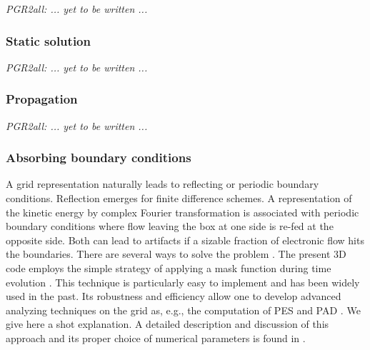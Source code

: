 \documentclass[final,1p]{elsarticle}
\newcommand{\PGRcomm}[1]{{\color{blue}\small\em PGR2all: #1}}
\begin{document}
\centerline{\PGRcomm{... yet to be written ...}}



\subsubsection{Static solution}
\label{sec:numstatic}

\centerline{\PGRcomm{... yet to be written ...}}



\subsubsection{Propagation}
\label{sec:numdyn}

\centerline{\PGRcomm{... yet to be written ...}}


\subsubsection{Absorbing boundary conditions}
\label{sec:abso}


A grid representation naturally leads to reflecting or periodic
boundary conditions.  Reflection emerges for finite difference
schemes.  A representation of the kinetic energy by complex Fourier
transformation is associated with periodic boundary conditions where
flow leaving the box at one side is re-fed at the opposite side. Both
can lead to artifacts if a sizable fraction of electronic flow hits
the boundaries.  There are several ways to solve the problem
\cite{Wop14aR}.  The present 3D code employs the simple strategy of
applying a mask function during time evolution \cite{Kra92a}. This
technique is particularly easy to implement and has been widely used
in the past. Its robustness and efficiency allow one to develop
advanced analyzing techniques on the grid as, e.g., the computation of
PES and PAD \cite{Rei06f}.  We give here a shot explanation.  A
detailed description and discussion of this approach and its proper
choice of numerical parameters is found in \cite{Rei06c}.
\end{document}
